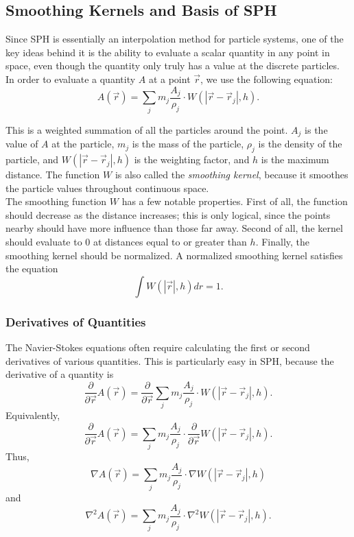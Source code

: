 \documentclass[a4paper]{article}
\begin{document}
\subsection{Smoothing Kernels and Basis of SPH}
Since SPH is essentially an interpolation method for particle systems, one of the key ideas behind it is the ability to evaluate a scalar quantity in any point in space, even though the quantity only truly has a value at the discrete particles. \\

In order to evaluate a quantity $A$ at a point $\vec r$, we use the following equation:
\[A(\vec r) = \sum_j m_j\frac{A_j}{\rho_j}\cdot W(|\vec r - \vec r_j|, h).\]

This is a weighted summation of all the particles around the point. $A_j$ is the value of $A$ at the particle, $m_j$ is the mass of the particle, $\rho_j$ is the density of the particle, and $W(|\vec r - \vec r_j|, h)$ is the weighting factor, and $h$ is the maximum distance. The function $W$ is also called the \emph{smoothing kernel}, because it smoothes the particle values throughout continuous space. \\


    The smoothing function $W$ has a few notable properties. First of all, the function should decrease as the distance increases; this is only logical, since the points nearby should have more influence than those far away. Second of all, the kernel should evaluate to 0 at distances equal to or greater than $h$. Finally, the smoothing kernel should be normalized. A normalized smoothing kernel satisfies the equation
\[\int W(|\vec r|, h) dr = 1.\]

\subsubsection{Derivatives of Quantities}
The Navier-Stokes equations often require calculating the first or second derivatives of various quantities. This is particularly easy in SPH, because the derivative of a quantity is
\[\frac{\partial}{\partial \vec r} A(\vec r) = \frac{\partial}{\partial \vec r} \sum_j m_j\frac{A_j}{\rho_j}\cdot W(|\vec r - \vec r_j|, h).\]
Equivalently,
\[\frac{\partial}{\partial \vec r} A(\vec r) = \sum_j m_j\frac{A_j}{\rho_j}\cdot \frac{\partial}{\partial \vec r} W(|\vec r - \vec r_j|, h).\]
Thus,
\[\nabla A(\vec r) = \sum_j m_j\frac{A_j}{\rho_j}\cdot \nabla W(|\vec r - \vec r_j|, h)\]
and
\[\nabla^2 A(\vec r) = \sum_j m_j\frac{A_j}{\rho_j}\cdot \nabla^2 W(|\vec r - \vec r_j|, h).\]
\end{document}
